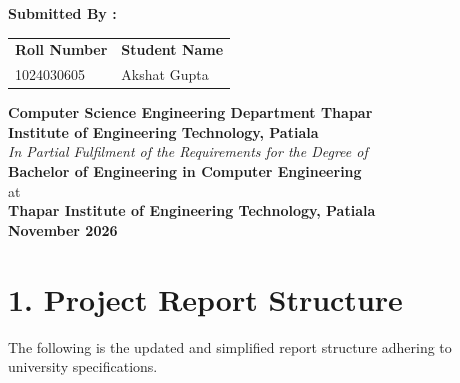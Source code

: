 \documentclass[12pt,a4paper]{report}
\begin{document}
\begin{titlepage}
\begin{center}
    \begin{flushleft}
    \hspace*{2.2cm}\textbf{\large Submitted By :}\\[0.3cm]
    \hspace*{2.2cm}\begin{tabular}{ll}
        \textbf{Roll Number} & \textbf{Student Name}\\[0.15cm]
        1024030605 & Akshat Gupta
    \end{tabular}
    \end{flushleft}

    \vfill

    {\textbf{\large Computer Science Engineering Department Thapar\\Institute of Engineering Technology, Patiala}}\\[0.4cm]
    {\normalsize \textit{In Partial Fulfilment of the Requirements for the Degree of}}\\[0.1cm]
    {\textbf{Bachelor of Engineering in Computer Engineering}}\\[0.15cm]
    {\normalsize at}\\[0.15cm]
    {\textbf{Thapar Institute of Engineering Technology, Patiala}}\\[0.5cm]
    {\textbf{\large November 2026}}
\end{center}
\end{titlepage}

\newpage
\setcounter{page}{2}

\section*{\color{ThaparCrimson} 1. Project Report Structure}

\noindent The following is the updated and simplified report structure adhering to university specifications.
\end{document}
